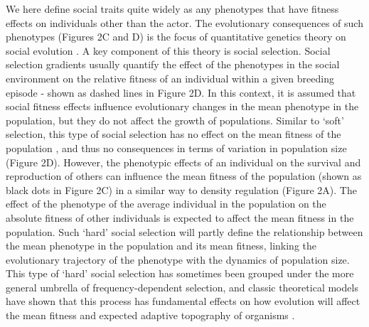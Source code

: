 \documentclass{article}
\begin{document}
We here define social traits quite widely as any phenotypes that have fitness effects on individuals other than the actor. The evolutionary consequences of such phenotypes  (Figures 2C and D) is the focus of quantitative genetics theory on social evolution \citep{frank1998foundations, Araya-Ajoy2020}. A key component of this theory is social selection. Social selection gradients usually quantify the effect of the phenotypes in the social environment on the relative fitness of an individual within a given breeding episode \citep{Wolf1999SocialSelection} - shown as dashed lines in Figure 2D. In this context, it is assumed that social fitness effects influence evolutionary changes in the mean phenotype in the population, but they do not affect the growth of populations. Similar to `soft' selection, this type of social selection has no effect on the mean fitness of the population \citep{Goodnight1992}, and thus no consequences in terms of variation in population size (Figure 2D). However, the phenotypic effects of an individual on the survival and reproduction of others can influence the mean fitness of the population (shown as black dots in Figure 2C) in a similar way to density regulation (Figure 2A). The effect of the phenotype of the average individual in the population on the absolute fitness of other individuals is expected to affect the mean fitness in the population. Such `hard' social selection will partly define the relationship between the mean phenotype in the population and its mean fitness, linking the evolutionary trajectory of the phenotype with the dynamics of population size. This type of `hard' social selection has sometimes been grouped under the more general umbrella of frequency-dependent selection, and classic theoretical models have shown that this process has fundamental effects on how evolution will affect the mean fitness and expected adaptive topography of organisms \citep{Wright1969}.
 
\end{document}
